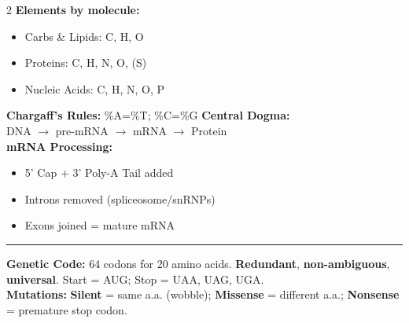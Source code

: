 \documentclass[11pt, letterpaper]{article}
\newcommand{\divider}{\par\noindent\rule{\textwidth}{0.4pt}\par\vspace{2pt}}
\begin{document}
\vspace{4pt}

\begin{tcolorbox}[colback=part4bg, colframe=sectionorange,
  title={\bfseries CHNOPS, Central Dogma \& Mutations}, arc=3pt, boxrule=1pt]
\begin{multicols}{2}
\textbf{Elements by molecule:}
\begin{itemize}[noitemsep, leftmargin=*]
  \item Carbs \& Lipids: C, H, O
  \item Proteins: C, H, N, O, (S)
  \item Nucleic Acids: C, H, N, O, P
\end{itemize}
\textbf{Chargaff's Rules:} \%A=\%T; \%C=\%G
\columnbreak
\textbf{Central Dogma:}\\
DNA $\to$ pre-mRNA $\to$ mRNA $\to$ Protein\\[4pt]
\textbf{mRNA Processing:}
\begin{itemize}[noitemsep, leftmargin=*]
  \item 5' Cap + 3' Poly-A Tail added
  \item Introns removed (spliceosome/snRNPs)
  \item Exons joined = mature mRNA
\end{itemize}
\end{multicols}
\divider
\textbf{Genetic Code:} 64 codons for 20 amino acids. \textbf{Redundant}, \textbf{non-ambiguous}, \textbf{universal}. Start = AUG; Stop = UAA, UAG, UGA.\\[2pt]
\textbf{Mutations:} \textbf{Silent} = same a.a. (wobble); \textbf{Missense} = different a.a.; \textbf{Nonsense} = premature stop codon.
\end{tcolorbox}

\vspace{4pt}
\end{document}
